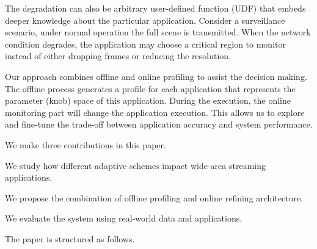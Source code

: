 The degradation can also be arbitrary user-defined function (UDF) that embeds
deeper knowledge about the particular application. Consider a surveillance
scenario, under normal operation the full scene is transmitted. When the network
condition degrades, the application may choose a critical region to monitor
instead of either dropping frames or reducing the resolution.


Our approach combines offline and online profiling to assist the decision
making. The offline process generates a profile for each application that
represents the parameter (knob) space of this application. During the execution,
the online monitoring part will change the application execution. This allows us
to explore and fine-tune the trade-off between application accuracy and system
performance.


We make three contributions in this paper.

\squishlist    %
\item We study how different adaptive schemes impact wide-area streaming
  applications.
\item We propose the combination of offline profiling and online refining
  architecture.
\item We evaluate the system using real-world data and applications.
\squishend %

The paper is structured as follows.

\newpage

